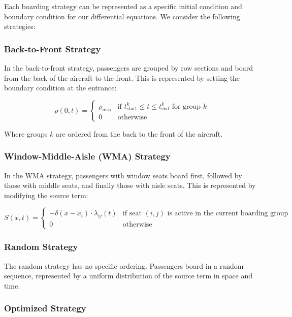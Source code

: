 \documentclass[a4paper,12pt]{article}
\begin{document}
Each boarding strategy can be represented as a specific initial condition and boundary condition for our differential equations. We consider the following strategies:

\subsubsection{Back-to-Front Strategy}

In the back-to-front strategy, passengers are grouped by row sections and board from the back of the aircraft to the front. This is represented by setting the boundary condition at the entrance:

\begin{equation}
\rho(0,t) = 
\begin{cases}
\rho_{\text{max}} & \text{if } t_{\text{start}}^k \leq t \leq t_{\text{end}}^k \text{ for group } k \\
0 & \text{otherwise}
\end{cases}
\end{equation}

Where groups $k$ are ordered from the back to the front of the aircraft.

\subsubsection{Window-Middle-Aisle (WMA) Strategy}

In the WMA strategy, passengers with window seats board first, followed by those with middle seats, and finally those with aisle seats. This is represented by modifying the source term:

\begin{equation}
S(x,t) = 
\begin{cases}
-\delta(x - x_i) \cdot \lambda_{ij}(t) & \text{if seat } (i,j) \text{ is active in the current boarding group} \\
0 & \text{otherwise}
\end{cases}
\end{equation}

\subsubsection{Random Strategy}

The random strategy has no specific ordering. Passengers board in a random sequence, represented by a uniform distribution of the source term in space and time.

\subsubsection{Optimized Strategy}
\end{document}
